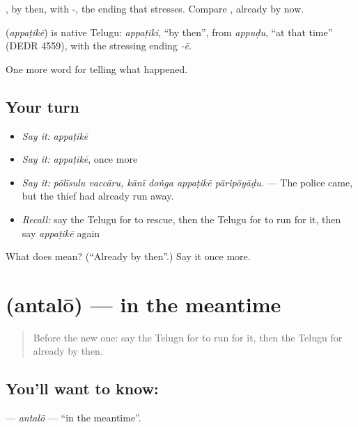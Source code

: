 , by then, with -, the ending that stresses. Compare , already by now.

\begin{cousinweb}
\textbf{} (\emph{appaṭikē}) is native Telugu: \emph{appaṭiki}, \textquotedblleft{}by then\textquotedblright{}, from \emph{appuḍu}, \textquotedblleft{}at that time\textquotedblright{} (DEDR 4559), with the stressing ending \emph{-ē}.
\end{cousinweb}

\begin{grammarlens}[title={What you've built}]
One more word for telling what happened.
\end{grammarlens}

\subsection*{Your turn}
\begin{itemize}
\raggedright
  \item \emph{Say it:} \emph{appaṭikē}
  \item \emph{Say it:} \emph{appaṭikē}, once more
  \item \emph{Say it:} \emph{pōlīsulu vaccāru, kānī doṅga appaṭikē pāripōyāḍu.} — The police came, but the thief had already run away.
  \item \emph{Recall:} say the Telugu for to rescue, then the Telugu for to run for it, then say \emph{appaṭikē} again
\end{itemize}

\begin{tcolorbox}[breakable,colback=teal!4,colframe=teal!35!black,title={Before you move on}]
What does  mean? (\textquotedblleft{}Already by then\textquotedblright{}.) Say it once more.
\end{tcolorbox}
\section[\texorpdfstring{\te{అంతలో} (antalō)}{అంతలో (antalō)}]{ (antalō) — in the meantime}

\label{lesson:TE-C332-antalo}



\begin{quote}
Before the new one: say the Telugu for to run for it, then the Telugu for already by then.
\end{quote}

\subsection*{You'll want to know: }
\textbf{} — \emph{antalō} — \textquotedblleft{}in the meantime\textquotedblright{}.

